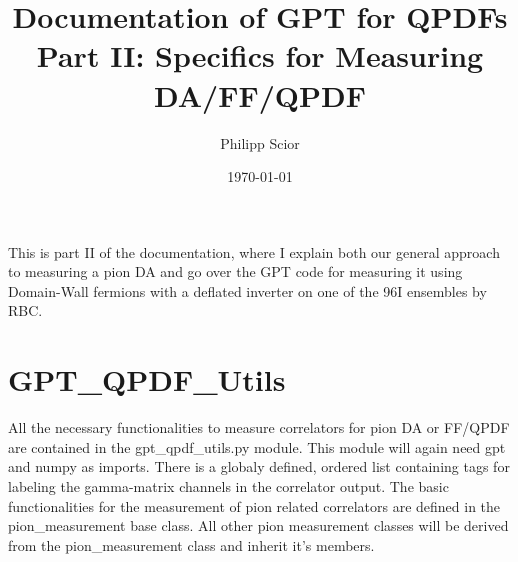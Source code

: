 \documentclass[a4paper,10pt]{scrartcl}
\title{Documentation of GPT for QPDFs \newline Part II: Specifics for Measuring DA/FF/QPDF}
\author{Philipp Scior}
\date{\today}
\begin{document}
\maketitle

This is part II of the documentation, where I explain both our general approach to measuring a pion DA and go over the GPT code for measuring it
using Domain-Wall fermions with a deflated inverter on one of the 96I ensembles by RBC.

\section{GPT\_QPDF\_Utils}
All the necessary functionalities to measure correlators for pion DA or FF/QPDF are contained in the 
gpt\_qpdf\_utils.py module. This module will again need gpt and numpy as imports. There is a globaly defined,
ordered list containing tags for labeling the gamma-matrix channels in the correlator output. \newline
The basic functionalities for the measurement of pion related correlators are defined in the pion\_measurement
base class. All other pion measurement classes will be derived from the pion\_measurement class and inherit it's
members.
\end{document}
